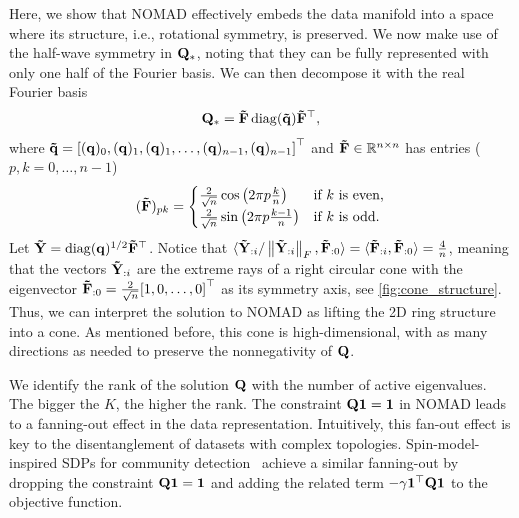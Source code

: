 \documentclass[twoside,11pt]{article}
\begin{document}
Here, we show that NOMAD effectively embeds the data manifold into a space where its structure, i.e., rotational symmetry, is preserved.
We now make use of the half-wave symmetry in ${\mathbf{Q}}_*$, noting that they can be fully represented with only one half of the Fourier basis. We can then decompose it with the real Fourier basis
\begin{equation}
	{\mathbf{Q}}_* = {\mathbf{\tilde{F}}} \operatorname{diag}({\mathbf{\tilde{q}}}) {{\mathbf{\tilde{F}}}}^\top ,
	\label{eq:fourier_expansion_real}
\end{equation}
where
${\mathbf{\tilde{q}}} = { [ ({\mathbf{q}})_0, ({\mathbf{q}})_1, ({\mathbf{q}})_1, \dots, ({\mathbf{q}})_{n-1}, ({\mathbf{q}})_{n-1} ] }^\top$
and
${\mathbf{\tilde{F}}} \in {\mathbb R}^{n \times n}$ has entries ($p,k = 0, \dots, n-1$)
\begin{equation}
	({\mathbf{\tilde{F}}})_{pk} =
	\begin{cases}
		\tfrac{2}{\sqrt{n}} \cos \left( 2\pi p \tfrac{k}{n} \right) & \text{if $k$ is even,} \\
		\tfrac{2}{\sqrt{n}} \sin \left( 2\pi p \tfrac{k-1}{n} \right) & \text{if $k$ is odd.} \\
	\end{cases}
	\label{eq:fourier_matrix_real}
\end{equation}
Let ${\mathbf{\tilde{Y}}} = \operatorname{diag}({\mathbf{q}})^{1/2} {{\mathbf{\tilde{F}}}}^\top$.
Notice that
$
	\langle {\mathbf{\tilde{Y}}}_{:i} / \left\| {\mathbf{\tilde{Y}}}_{:i} \right\|_{F}, {\mathbf{\tilde{F}}}_{:0} \rangle = \langle{\mathbf{\tilde{F}}}_{:i}, {\mathbf{\tilde{F}}}_{:0} \rangle = \tfrac{4}{n}
$,
meaning that the vectors ${\mathbf{\tilde{Y}}}_{:i}$ are the extreme rays of a right circular cone with the eigenvector ${\mathbf{\tilde{F}}}_{:0} = \tfrac{2}{\sqrt{n}} {[ 1, 0, \dots, 0 ]}^\top$ as its symmetry axis, see \cref{fig:cone_structure}. Thus, we can interpret the solution to NOMAD as lifting the 2D ring structure into a cone. As mentioned before, this cone is high-dimensional, with as many directions as needed to preserve the nonnegativity of ${\mathbf{Q}}$.

We identify the rank of the solution ${\mathbf{Q}}$ with the number of active eigenvalues. 
The bigger the $K$, the higher the rank. The constraint ${\mathbf{Q}} {\mathbf{1}} = {\mathbf{1}}$ in NOMAD leads to a fanning-out effect in the data representation.
Intuitively, this fan-out effect is key to the disentanglement of datasets with complex topologies. Spin-model-inspired SDPs for community detection~\citep{Javanmard2016} achieve a similar fanning-out by dropping the constraint ${\mathbf{Q}} {\mathbf{1}} = {\mathbf{1}}$ and adding the related term $-\gamma {{\mathbf{1}}}^\top {\mathbf{Q}} {\mathbf{1}}$ to the objective function.
\end{document}
